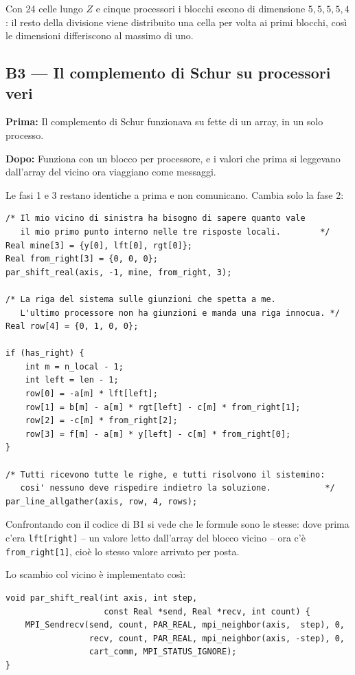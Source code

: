 \documentclass[11pt,a4paper]{article}
\newcommand{\prima}[1]{\par\smallskip\noindent\textbf{\color{scuro}Prima:} #1\par}
\newcommand{\dopo}[1]{\par\smallskip\noindent\textbf{\color{scuro}Dopo:} #1\par\smallskip}
\newcommand{\cd}[1]{\texttt{\small #1}}
\newenvironment{blocco}{\par\noindent\begin{minipage}{\linewidth}}{\end{minipage}\par}
\begin{document}
Con 24 celle lungo $Z$ e cinque processori i blocchi escono di dimensione
$5,5,5,5,4$: il resto della divisione viene distribuito una cella per volta ai
primi blocchi, così le dimensioni differiscono al massimo di uno.

\subsection*{B3 --- Il complemento di Schur su processori veri}

\prima{Il complemento di Schur funzionava su fette di un array, in un solo
processo.}
\dopo{Funziona con un blocco per processore, e i valori che prima si leggevano
dall'array del vicino ora viaggiano come messaggi.}

Le fasi 1 e 3 restano identiche a prima e non comunicano. Cambia solo la fase 2:

\begin{blocco}
\begin{lstlisting}
/* Il mio vicino di sinistra ha bisogno di sapere quanto vale
   il mio primo punto interno nelle tre risposte locali.        */
Real mine[3] = {y[0], lft[0], rgt[0]};
Real from_right[3] = {0, 0, 0};
par_shift_real(axis, -1, mine, from_right, 3);

/* La riga del sistema sulle giunzioni che spetta a me.
   L'ultimo processore non ha giunzioni e manda una riga innocua. */
Real row[4] = {0, 1, 0, 0};

if (has_right) {
    int m = n_local - 1;
    int left = len - 1;
    row[0] = -a[m] * lft[left];
    row[1] = b[m] - a[m] * rgt[left] - c[m] * from_right[1];
    row[2] = -c[m] * from_right[2];
    row[3] = f[m] - a[m] * y[left] - c[m] * from_right[0];
}

/* Tutti ricevono tutte le righe, e tutti risolvono il sistemino:
   cosi' nessuno deve rispedire indietro la soluzione.           */
par_line_allgather(axis, row, 4, rows);
\end{lstlisting}
\end{blocco}

Confrontando con il codice di B1 si vede che le formule sono le stesse: dove
prima c'era \cd{lft[right]} -- un valore letto dall'array del blocco vicino --
ora c'è \cd{from\_right[1]}, cioè lo stesso valore arrivato per posta.

Lo scambio col vicino è implementato così:

\begin{lstlisting}
void par_shift_real(int axis, int step,
                    const Real *send, Real *recv, int count) {
    MPI_Sendrecv(send, count, PAR_REAL, mpi_neighbor(axis,  step), 0,
                 recv, count, PAR_REAL, mpi_neighbor(axis, -step), 0,
                 cart_comm, MPI_STATUS_IGNORE);
}
\end{lstlisting}
\end{document}
